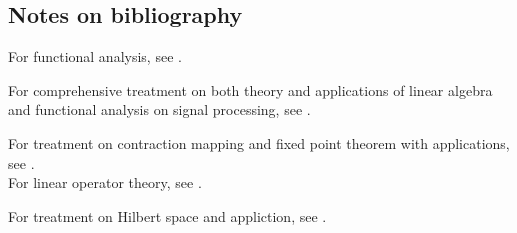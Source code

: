 \begin{refsection}
\section{Notes on bibliography}
For functional analysis, see \cite{kreyszig1989introductory}\cite{lax2014functional}\cite{duren2012invitation}.

For comprehensive treatment on both theory and applications of linear algebra and functional analysis on signal processing, see \cite{moon2000mathematical}.

For treatment on contraction mapping and fixed point theorem with applications, see \cite{griffel2002applied}\cite{ok2007real}\cite{debnath2005hilbert}.\\

For linear operator theory, see \cite{naylor2000linear}.

For treatment on Hilbert space and appliction, see \cite{debnath2005hilbert}.


\printbibliography


\end{refsection}
